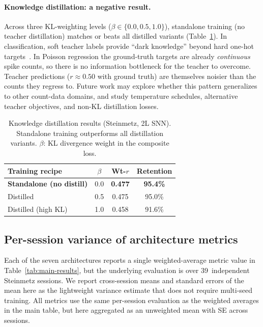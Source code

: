 \documentclass{article}
\begin{document}
\paragraph{Knowledge distillation: a negative result.}
Across three KL-weighting levels ($\beta \in \{0.0, 0.5, 1.0\}$),
standalone training (no teacher distillation) matches or beats all
distilled variants (Table~\ref{tab:distill}).  In classification, soft
teacher labels provide ``dark knowledge'' beyond hard one-hot
targets~\citep{hinton2015distilling}.  In Poisson regression the
ground-truth targets are already \emph{continuous} spike counts, so
there is no information bottleneck for the teacher to overcome.  Teacher
predictions ($r \approx 0.50$ with ground truth) are themselves
noisier than the counts they regress to.  Future work may explore
whether this pattern generalizes to other count-data domains, and
study temperature schedules, alternative teacher objectives, and
non-KL distillation losses.

\begin{table}[h]
  \caption{Knowledge distillation results (Steinmetz, 2L SNN).
    Standalone training outperforms all distillation variants.
    $\beta$: KL divergence weight in the composite loss.}
  \label{tab:distill}
  \centering
  \small
  \begin{tabular}{@{} l c c c @{}}
    \toprule
    \textbf{Training recipe} & $\beta$
      & \textbf{Wt-$r$} & \textbf{Retention} \\
    \midrule
    \textbf{Standalone (no distill)} & 0.0
      & \textbf{0.477} & \textbf{95.4\%} \\
    Distilled             & 0.5  & 0.475 & 95.0\% \\
    Distilled (high KL)   & 1.0  & 0.458 & 91.6\% \\
    \bottomrule
  \end{tabular}
\end{table}

\subsection{Per-session variance of architecture metrics}
\label{app:per-session-se}

Each of the seven architectures reports a single weighted-average
metric value in Table~\ref{tab:main-results}, but the underlying
evaluation is over 39~independent Steinmetz sessions.  We report
cross-session means and standard errors of the mean here as the
lightweight variance estimate that does not require multi-seed
training.  All metrics use the same per-session evaluation as the
weighted averages in the main table, but here aggregated as an
unweighted mean with SE across sessions.
\end{document}
